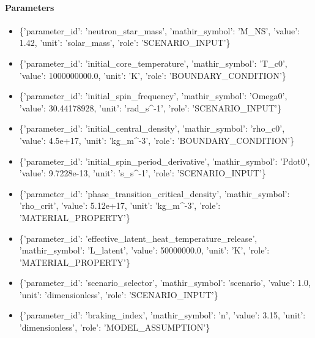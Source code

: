 \documentclass[11pt]{article}
\begin{document}
\paragraph{Parameters}
\begin{itemize}\raggedright
\item \{'parameter\_\allowbreak{}id': 'neutron\_\allowbreak{}star\_\allowbreak{}mass', 'mathir\_\allowbreak{}symbol': 'M\_\allowbreak{}NS', 'value': 1.42, 'unit': 'solar\_\allowbreak{}mass', 'role': 'SCENARIO\_\allowbreak{}INPUT'\}
\item \{'parameter\_\allowbreak{}id': 'initial\_\allowbreak{}core\_\allowbreak{}temperature', 'mathir\_\allowbreak{}symbol': 'T\_\allowbreak{}c0', 'value': 1000000000.0, 'unit': 'K', 'role': 'BOUNDARY\_\allowbreak{}CONDITION'\}
\item \{'parameter\_\allowbreak{}id': 'initial\_\allowbreak{}spin\_\allowbreak{}frequency', 'mathir\_\allowbreak{}symbol': 'Omega0', 'value': 30.44178928, 'unit': 'rad\_\allowbreak{}s\textasciicircum{}-1', 'role': 'SCENARIO\_\allowbreak{}INPUT'\}
\item \{'parameter\_\allowbreak{}id': 'initial\_\allowbreak{}central\_\allowbreak{}density', 'mathir\_\allowbreak{}symbol': 'rho\_\allowbreak{}c0', 'value': 4.5e+17, 'unit': 'kg\_\allowbreak{}m\textasciicircum{}-3', 'role': 'BOUNDARY\_\allowbreak{}CONDITION'\}
\item \{'parameter\_\allowbreak{}id': 'initial\_\allowbreak{}spin\_\allowbreak{}period\_\allowbreak{}derivative', 'mathir\_\allowbreak{}symbol': 'Pdot0', 'value': 9.7228e-13, 'unit': 's\_\allowbreak{}s\textasciicircum{}-1', 'role': 'SCENARIO\_\allowbreak{}INPUT'\}
\item \{'parameter\_\allowbreak{}id': 'phase\_\allowbreak{}transition\_\allowbreak{}critical\_\allowbreak{}density', 'mathir\_\allowbreak{}symbol': 'rho\_\allowbreak{}crit', 'value': 5.12e+17, 'unit': 'kg\_\allowbreak{}m\textasciicircum{}-3', 'role': 'MATERIAL\_\allowbreak{}PROPERTY'\}
\item \{'parameter\_\allowbreak{}id': 'effective\_\allowbreak{}latent\_\allowbreak{}heat\_\allowbreak{}temperature\_\allowbreak{}release', 'mathir\_\allowbreak{}symbol': 'L\_\allowbreak{}latent', 'value': 50000000.0, 'unit': 'K', 'role': 'MATERIAL\_\allowbreak{}PROPERTY'\}
\item \{'parameter\_\allowbreak{}id': 'scenario\_\allowbreak{}selector', 'mathir\_\allowbreak{}symbol': 'scenario', 'value': 1.0, 'unit': 'dimensionless', 'role': 'SCENARIO\_\allowbreak{}INPUT'\}
\item \{'parameter\_\allowbreak{}id': 'braking\_\allowbreak{}index', 'mathir\_\allowbreak{}symbol': 'n', 'value': 3.15, 'unit': 'dimensionless', 'role': 'MODEL\_\allowbreak{}ASSUMPTION'\}

\end{itemize}
\end{document}
